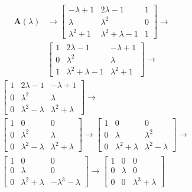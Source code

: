 \begin{align*}
    \bm{A}(\lambda) & \to \begin{bmatrix}
                              -\lambda + 1  & 2\lambda - 1            & 1 \\
                              \lambda       & \lambda^2               & 0 \\
                              \lambda^2 + 1 & \lambda^2 + \lambda - 1 & 1
                          \end{bmatrix} \to \\
                    & \begin{bmatrix}
                          1 & 2\lambda - 1            & -\lambda + 1  \\
                          0 & \lambda^2               & \lambda       \\
                          1 & \lambda^2 + \lambda - 1 & \lambda^2 + 1
                      \end{bmatrix} \to
\end{align*}
\begin{align*}
     & \begin{bmatrix}
           1 & 2\lambda - 1        & -\lambda + 1        \\
           0 & \lambda^2           & \lambda             \\
           0 & \lambda^2 - \lambda & \lambda^2 + \lambda
       \end{bmatrix} \to                   \\
     & \begin{bmatrix}
           1 & 0                   & 0                   \\
           0 & \lambda^2           & \lambda             \\
           0 & \lambda^2 - \lambda & \lambda^2 + \lambda
       \end{bmatrix} \to \begin{bmatrix}
                             1 & 0                   & 0                   \\
                             0 & \lambda             & \lambda^2           \\
                             0 & \lambda^2 + \lambda & \lambda^2 - \lambda
                         \end{bmatrix} \to \\
     & \begin{bmatrix}
           1 & 0                   & 0                    \\
           0 & \lambda             & 0                    \\
           0 & \lambda^2 + \lambda & -\lambda^3 - \lambda
       \end{bmatrix} \to \begin{bmatrix}
                             1 & 0       & 0                   \\
                             0 & \lambda & 0                   \\
                             0 & 0       & \lambda^3 + \lambda
                         \end{bmatrix}
\end{align*}
